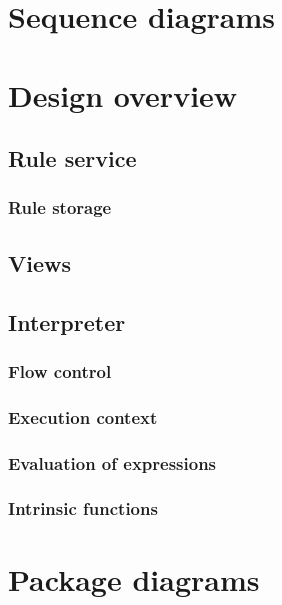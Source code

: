 \documentclass[12pt,letterpaper]{article}
\begin{document}
\newpage 
\section{Sequence diagrams}

\newpage 
\section{Design overview}

\subsection{Rule service}

\subsubsection{Rule storage}

\subsection{Views}

\subsection{Interpreter}

\subsubsection{Flow control}

\subsubsection{Execution context}

\subsubsection{Evaluation of expressions}

\subsubsection{Intrinsic functions}


\newpage 
\section{Package diagrams}
\end{document}
